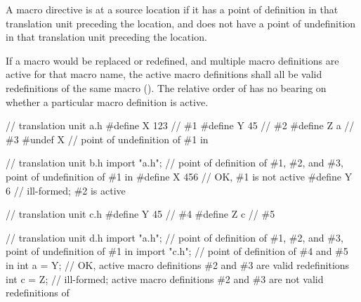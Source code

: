 \begin{std.txt}
\alinea
A macro directive is  at a source location
if it has a point of definition in that translation unit preceding the location,
and does not have a point of undefinition in that translation unit preceding
the location.

\alinea
If a macro would be replaced or redefined, and multiple macro definitions
are active for that macro name, the active macro definitions shall all be
valid redefinitions of the same macro ().
\enternote
The relative order of  has no bearing on whether a
particular macro definition is active.
\exitnote

\alinea
\begin{example}
\begin{codeblock}
// translation unit a.h
#define X 123 // \#1
#define Y 45  // \#2
#define Z a   // \#3
#undef X      // point of undefinition of \#1 in 
\end{codeblock}

\begin{codeblock}
// translation unit b.h
import "a.h"; // point of definition of \#1, \#2, and \#3, point of undefinition of \#1 in 
#define X 456 // OK, \#1 is not active
#define Y 6   // ill-formed; \#2 is active
\end{codeblock}

\begin{codeblock}
// translation unit c.h
#define Y 45  // \#4
#define Z c   // \#5
\end{codeblock}

\begin{codeblock}
// translation unit d.h
import "a.h"; // point of definition of \#1, \#2, and \#3, point of undefinition of \#1 in 
import "c.h"; // point of definition of \#4 and \#5 in 
int a = Y;    // OK, active macro definitions \#2 and \#3 are valid redefinitions
int c = Z;    // ill-formed; active macro definitions \#2 and \#3 are not valid redefinitions of 
\end{codeblock}
\end{example}
\end{std.txt}

